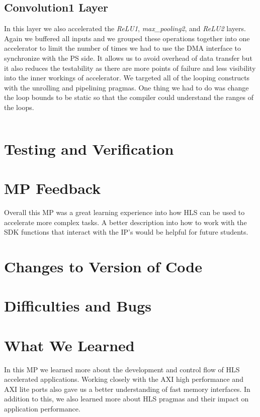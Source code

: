 \documentclass[10pt]{article}
\begin{document}
\subsection{Convolution1 Layer}
In this layer we also accelerated the \textit{ReLU1}, \textit{max\_pooling2}, and \textit{ReLU2} layers. Again we buffered all inputs and we grouped these operations together into one accelerator to limit the number of times we had to use the DMA interface to synchronize with the PS side. It allows us to avoid overhead of data transfer but it also reduces the testability as there are more points of failure and less visibility into the inner workings of accelerator. We targeted all of the looping constructs with the unrolling and pipelining pragmas. One thing we had to do was change the loop bounds to be static so that the compiler could understand the ranges of the loops.
\begin{mdframed}
\begin{verbatim}

\end{verbatim}
\end{mdframed}


\section{Testing and Verification}



\section{MP Feedback}
Overall this MP was a great learning experience into how HLS can be used to accelerate more complex tasks. A better description into how to work with the SDK functions that interact with the IP's would be helpful for future students. 



\section{Changes to Version of Code}


\section{Difficulties and Bugs}



\section{What We Learned}
In this MP we learned more about the development and control flow of HLS accelerated applications. Working closely with the AXI high performance and AXI lite ports also gave us a better understanding of fast memory interfaces. In addition to this, we also learned more about HLS pragmas and their impact on application performance. 
\end{document}
